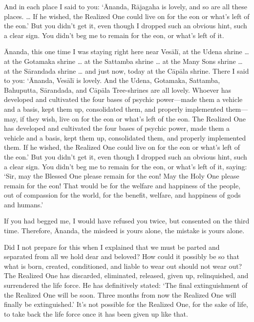 \documentclass[12pt,openany]{book}%
\begin{document}
And in each place I said to you: ‘Ānanda, \textsanskrit{Rājagaha} is lovely, and so are all these places. … If he wished, the Realized One could live on for the eon or what’s left of the eon.’ But you didn’t get it, even though I dropped such an obvious hint, such a clear sign. You didn’t beg me to remain for the eon, or what’s left of it. 

Ānanda, this one time I was staying right here near \textsanskrit{Vesālī}, at the Udena shrine … at the Gotamaka shrine … at the Sattamba shrine … at the Many Sons shrine … at the \textsanskrit{Sārandada} shrine … and just now, today at the \textsanskrit{Cāpāla} shrine. There I said to you: ‘Ānanda, \textsanskrit{Vesālī} is lovely. And the Udena, Gotamaka, Sattamba, Bahuputta, \textsanskrit{Sārandada}, and \textsanskrit{Cāpāla} Tree-shrines are all lovely. Whoever has developed and cultivated the four bases of psychic power—made them a vehicle and a basis, kept them up, consolidated them, and properly implemented them—may, if they wish, live on for the eon or what’s left of the eon. The Realized One has developed and cultivated the four bases of psychic power, made them a vehicle and a basis, kept them up, consolidated them, and properly implemented them. If he wished, the Realized One could live on for the eon or what’s left of the eon.’ But you didn’t get it, even though I dropped such an obvious hint, such a clear sign. You didn’t beg me to remain for the eon, or what’s left of it, saying: ‘Sir, may the Blessed One please remain for the eon! May the Holy One please remain for the eon! That would be for the welfare and happiness of the people, out of compassion for the world, for the benefit, welfare, and happiness of gods and humans.’ 

If you had begged me, I would have refused you twice, but consented on the third time. Therefore, Ānanda, the misdeed is yours alone, the mistake is yours alone. 

Did I not prepare for this when I explained that we must be parted and separated from all we hold dear and beloved? How could it possibly be so that what is born, created, conditioned, and liable to wear out should not wear out? The Realized One has discarded, eliminated, released, given up, relinquished, and surrendered the life force. He has definitively stated: ‘The final extinguishment of the Realized One will be soon. Three months from now the Realized One will finally be extinguished.’ It’s not possible for the Realized One, for the sake of life, to take back the life force once it has been given up like that. 
\end{document}
